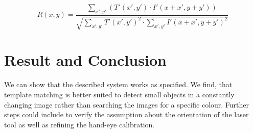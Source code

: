 \documentclass[11pt,twoside,twocolumn,a4paper]{article}
\begin{document}
\begin{equation}
R(x,y) = \frac{\sum_{x',y'} (T'(x',y') \cdot I'(x + x', y + y'))}{\sqrt{\sum_{x',y'} T'(x',y')^{2} \cdot \sum_{x',y'} I'(x + x', y + y')^{2}}}
\label{eq:template_matching}
\end{equation}




\section{Result and Conclusion}
We can show that the described system works as specified. We find, that template matching is better suited to detect small objects in a constantly changing image rather than searching the images for a specific colour.  
Further steps could include to verify the assumption about the orientation of the laser tool as well as refining the hand-eye calibration. 


{\small


}
\end{document}
